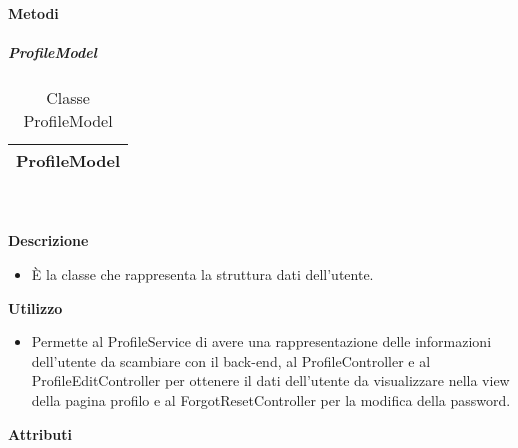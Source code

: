 		\textbf{Metodi} 
	\begin{itemize}
		\end{itemize}
			\subparagraph{ProfileModel} 
\begin{table}[ht]
\begin{center}
\bgroup
	\setlength{\arrayrulewidth}{0.6mm}
	\def\arraystretch{1}
		\begin{tabular}{ | p{12cm} | }
				\hline  
					\centerline{\textbf{ProfileModel}}
		\\ \hline 
				\hline
				\hline
		
		\end{tabular}
\egroup
\caption{Classe ProfileModel}
\end{center}
\end{table}  \textbf{\\ \\ Descrizione} 
					\begin{itemize}
						\item[] È la classe che rappresenta la struttura dati dell'utente.
					\end{itemize}      
				\textbf{Utilizzo}  
					\begin{itemize}
						\item[] Permette al ProfileService di avere una rappresentazione delle informazioni dell'utente da scambiare con il back-end, al ProfileController e al ProfileEditController per ottenere il dati dell'utente da visualizzare nella view della pagina profilo e al ForgotResetController per la modifica della password.
					\end{itemize}
			 \textbf{Attributi} 
	\begin{itemize}
		\end{itemize}
		
